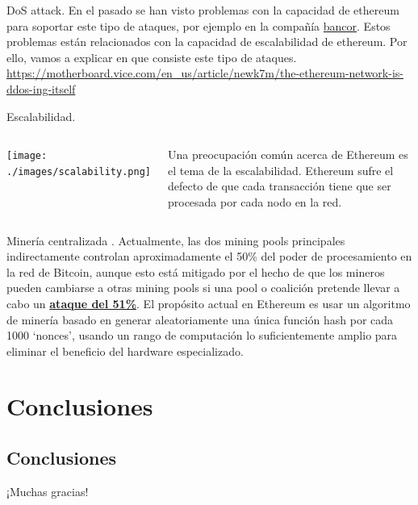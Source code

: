 \documentclass[usenames,dvipsnames]{beamer}
\begin{document}
\begin{frame}{ DoS attack. }
	En el pasado se han visto problemas con la capacidad de ethereum para soportar este tipo de ataques, por ejemplo en la compañía \underline{bancor}. Estos problemas están relacionados con la capacidad de escalabilidad de ethereum. Por ello, vamos a explicar en que consiste este tipo de ataques.\\
	\url{https://motherboard.vice.com/en_us/article/newk7m/the-ethereum-network-is-ddos-ing-itself}
\end{frame}

\begin{frame}{ Escalabilidad. }
	\begin{columns}

\texttt{[image: ./images/scalability.png]}

   
Una preocupación común acerca de Ethereum es el tema de la escalabilidad. Ethereum sufre el defecto de que cada transacción tiene que ser procesada por cada nodo en la red.

\end{columns}

\end{frame}
\begin{frame}{ Minería centralizada .}
Actualmente, las dos mining pools principales indirectamente controlan aproximadamente el 50\% del poder de procesamiento en la red de Bitcoin, aunque esto está mitigado por el hecho de que los mineros pueden cambiarse a otras mining pools si una pool o coalición pretende llevar a cabo un \underline{\textbf{ataque del 51\%}}. El propósito actual en Ethereum es usar un algoritmo de minería basado en generar aleatoriamente una única función hash por cada 1000 ‘nonces’, usando un rango de computación lo suficientemente amplio para eliminar el beneficio del hardware especializado.

\end{frame}
\section{Conclusiones}
\subsection{Conclusiones}
\begin{frame}[standout]
  ¡Muchas gracias!
\end{frame}
\end{document}
